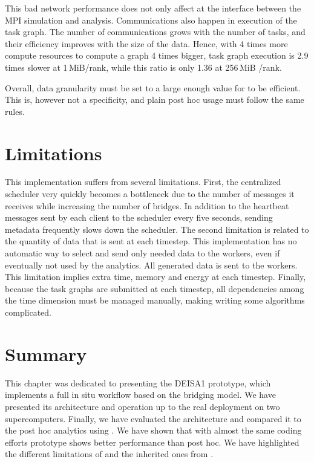 This bad network performance does not only affect \deisa at the interface between the MPI simulation and \dask analysis.
Communications also happen in \dask execution of the task graph.
The number of communications grows with the number of tasks, and their efficiency improves with the size of the data.
Hence, with 4 times more compute resources to compute a graph 4 times bigger, \dask task graph execution is 2.9 times slower at 1\,MiB/rank, while this ratio is only 1.36 at 256\,MiB /rank.

Overall, data granularity must be set to a large enough value for \deisa to be efficient.
This is, however not a \deisa specificity, and plain \dask post hoc usage must follow the same rules.

\section{Limitations}
This implementation suffers from several limitations. First, the centralized scheduler very quickly becomes a bottleneck due to the number of messages it receives while increasing the number of bridges. 
In addition to the heartbeat messages sent by each client to the scheduler every five seconds, sending metadata frequently slows down the scheduler. The second limitation is related to the quantity of data that is sent at each timestep. 
This implementation has no automatic way to select and send only needed data to the workers, even if eventually not used by the analytics. All generated data is sent to the workers. This limitation implies extra time, memory and energy at each timestep. 
Finally, because the task graphs are submitted at each timestep, all dependencies among the time dimension must be managed manually, making writing some algorithms complicated.  


\section{Summary}
This chapter was dedicated to presenting the DEISA1 prototype, which implements a full in situ workflow based on the \deisa bridging model.
We have presented its architecture and operation up to the real deployment on two supercomputers. Finally, we have evaluated the \deisa architecture and compared it to the post hoc analytics using \dask. 
We have shown that with almost the same coding efforts \deisa prototype shows better performance than post hoc. We have highlighted the different limitations of \deisa and the inherited ones from \dask.



